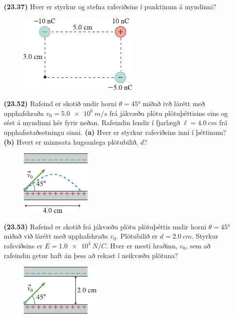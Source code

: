 \begin{enumerate}[label = \textbf{(\alph*)}]

\item[\textbf{(23.37)}] Hver er styrkur og stefna rafsviðsins í punktinum á myndinni?

\begin{figure}[H]
    \centering
    \includegraphics{figures/rk2337.pdf}
\end{figure}

\item[\textbf{(23.52)}] Rafeind er skotið undir horni $\theta = \ang{45}$ miðað ivð lárétt með upphafshraða $v_0 = \SI{5.0e6}{m/s}$ frá jákvæðu plötu plötuþéttisins eins og sést á myndinni hér fyrir neðan. Rafeindin lendir í fjarlægð $\ell = \SI{4.0}{cm}$ frá upphafsstaðsetningu sinni. \textbf{(a)} Hver er styrkur rafsviðsins inni í þéttinum? \textbf{(b)} Hvert er minnsata hugsanlega plötubilið, $d$?

\begin{figure}[H]
    \centering
    \includegraphics{figures/rk2352.pdf}
\end{figure}

\item[\textbf{(23.53)}] Rafeind er skotið frá jákvæðu plötu plötuþéttis undir horni $\theta = \ang{45}$ miðað við lárétt með upphafshraða $v_0$. Plötubilið er $d = \SI{2.0}{cm}$. Styrkur rafsviðsins er $E = \SI{1.0e4}{N/C}$. Hver er mesti hraðinn, $v_0$, sem að rafeindin getur haft án þess að rekast í neikvæðu plötuna?

\begin{figure}[H]
    \centering
    \includegraphics{figures/rk2353.pdf}
\end{figure}


\end{enumerate}
